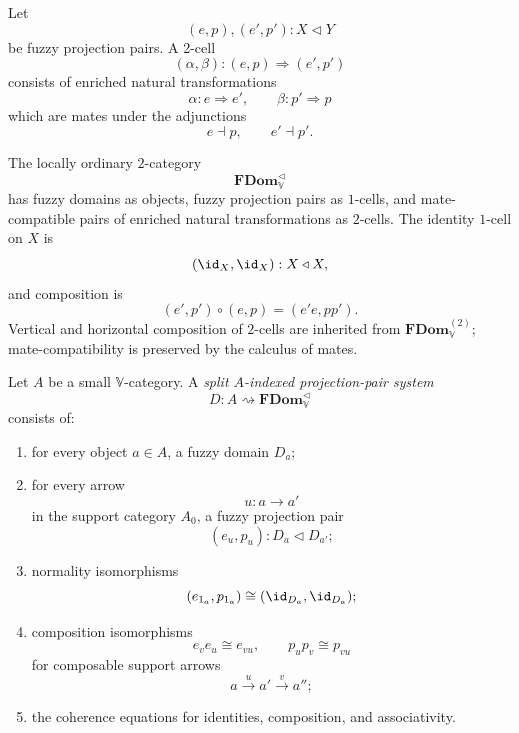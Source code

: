 \begin{definition}
\label{def:projection-pair-2-cells}
Let
\[
    (e,p),(e',p'):X\triangleleft Y
\]
be fuzzy projection pairs.  A 2-cell
\[
    (\alpha,\beta):(e,p)\Rightarrow(e',p')
\]
consists of enriched natural transformations
\[
    \alpha:e\Rightarrow e',
    \qquad
    \beta:p'\Rightarrow p
\]
which are mates under the adjunctions
\[
    e\dashv p,
    \qquad
    e'\dashv p'.
\]
\end{definition}

\begin{definition}
\label{def:projection-pair-2-category-ff}
The locally ordinary \(2\)-category
\[
    \mathbf{FDom}_{\mathbb V}^{\triangleleft}
\]
has fuzzy domains as objects, fuzzy projection pairs as \(1\)-cells, and
mate-compatible pairs of enriched natural transformations as \(2\)-cells.
The identity \(1\)-cell on \(X\) is
\[
    (\id_X,\id_X):X\triangleleft X,
\]
and composition is
\[
    (e',p')\circ(e,p)=(e'e,pp').
\]
Vertical and horizontal composition of \(2\)-cells are inherited from
\(\mathbf{FDom}^{(2)}_{\mathbb V}\); mate-compatibility is preserved by the
calculus of mates.
\end{definition}

\begin{definition}
\label{def:split-A-indexed-projection-pair-system}
Let \(A\) be a small \(\mathbb V\)-category.  A
\emph{split \(A\)-indexed projection-pair system}
\[
    D:A\rightsquigarrow\mathbf{FDom}_{\mathbb V}^{\triangleleft}
\]
consists of:

\begin{enumerate}
    \item for every object \(a\in A\), a fuzzy domain \(D_a\);

    \item for every arrow
    \[
        u:a\to a'
    \]
    in the support category \(A_0\), a fuzzy projection pair
    \[
        (e_u,p_u):D_a\triangleleft D_{a'};
    \]

    \item normality isomorphisms
    \[
        (e_{1_a},p_{1_a})\cong(\id_{D_a},\id_{D_a});
    \]

    \item composition isomorphisms
    \[
        e_v e_u\cong e_{vu},
        \qquad
        p_u p_v\cong p_{vu}
    \]
    for composable support arrows
    \[
        a\xrightarrow{u}a'\xrightarrow{v}a'';
    \]

    \item the coherence equations for identities, composition, and
    associativity.
\end{enumerate}
\end{definition}

